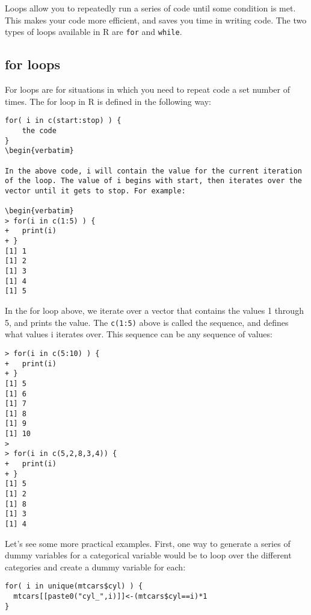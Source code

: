 \documentclass[12pt, oneside]{amsart}   	%
\begin{document}
Loops allow you to repeatedly run a series of code until some condition is met. This makes your code more efficient, and saves you time in writing code. The two types of loops available in R are \texttt{for} and \texttt{while}.

\subsection{for loops}

For loops are for situations in which you need to repeat code a set number of times. The for loop in R is defined in the following way:

\begin{verbatim}
for( i in c(start:stop) ) {
	the code
}
\begin{verbatim}

In the above code, i will contain the value for the current iteration of the loop. The value of i begins with start, then iterates over the vector until it gets to stop. For example:

\begin{verbatim}
> for(i in c(1:5) ) {
+   print(i)
+ }
[1] 1
[1] 2
[1] 3
[1] 4
[1] 5
\end{verbatim}

In the for loop above, we iterate over a vector that contains the values 1 through 5, and prints the value. The \texttt{c(1:5)} above is called the sequence, and defines what values i iterates over. This sequence can be any sequence of values:

\begin{verbatim}
> for(i in c(5:10) ) {
+   print(i)
+ }
[1] 5
[1] 6
[1] 7
[1] 8
[1] 9
[1] 10
> 
> for(i in c(5,2,8,3,4)) {
+   print(i)
+ }
[1] 5
[1] 2
[1] 8
[1] 3
[1] 4
\end{verbatim}

Let's see some more practical examples. First, one way to generate a series of dummy variables for a categorical variable would be to loop over the different categories and create a dummy variable for each:

\begin{verbatim}
for( i in unique(mtcars$cyl) ) {
  mtcars[[paste0("cyl_",i)]]<-(mtcars$cyl==i)*1
}
\end{verbatim}
\end{document}

